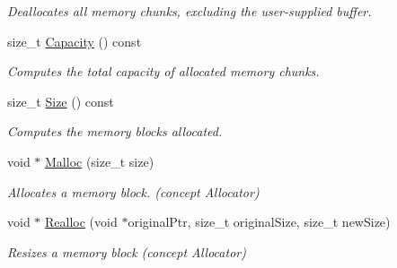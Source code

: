 \begin{DoxyCompactItemize}
\begin{DoxyCompactList}\small\item\em Deallocates all memory chunks, excluding the user-\/supplied buffer. \end{DoxyCompactList}\item 
size\+\_\+t \hyperlink{classMemoryPoolAllocator_a5672e0833fda2e71ce987911397489ed}{Capacity} () const
\begin{DoxyCompactList}\small\item\em Computes the total capacity of allocated memory chunks. \end{DoxyCompactList}\item 
size\+\_\+t \hyperlink{classMemoryPoolAllocator_ae7fcf0341c13e899cf488bc7c8949956}{Size} () const
\begin{DoxyCompactList}\small\item\em Computes the memory blocks allocated. \end{DoxyCompactList}\item 
\mbox{\label{classMemoryPoolAllocator_a02f6832910453446cb77bf919ba49e99}} 
void $\ast$ \hyperlink{classMemoryPoolAllocator_a02f6832910453446cb77bf919ba49e99}{Malloc} (size\+\_\+t size)
\begin{DoxyCompactList}\small\item\em Allocates a memory block. (concept Allocator) \end{DoxyCompactList}\item 
\mbox{\label{classMemoryPoolAllocator_aba75280d42184b0ad414243f7f5ac6c7}} 
void $\ast$ \hyperlink{classMemoryPoolAllocator_aba75280d42184b0ad414243f7f5ac6c7}{Realloc} (void $\ast$original\+Ptr, size\+\_\+t original\+Size, size\+\_\+t new\+Size)
\begin{DoxyCompactList}\small\item\em Resizes a memory block (concept Allocator) \end{DoxyCompactList}\end{DoxyCompactItemize}
